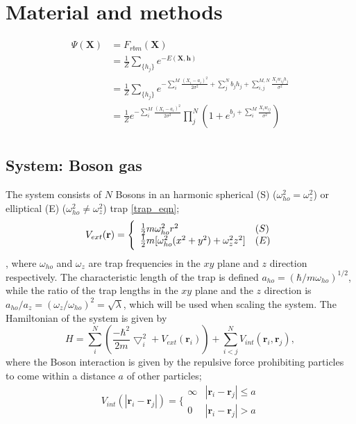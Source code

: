 \documentclass[%
oneside,                 %
final,                   %
10pt]{article}
\begin{document}
\section{Material and methods} \label{theory}

\begin{align*}
\Psi (\mathbf{X}) &= F_{rbm}(\mathbf{X}) \\
&= \frac{1}{Z}\sum_{\{h_j\}} e^{-E(\mathbf{X}, \mathbf{h})} \\
&= \frac{1}{Z} \sum_{\{h_j\}} e^{-\sum_i^M \frac{(X_i - a_i)^2}{2\sigma^2} + \sum_j^N b_j h_j + \sum_{i,j}^{M,N} \frac{X_i w_{ij} h_j}{\sigma^2}} \\
&= \frac{1}{Z} e^{-\sum_i^M \frac{(X_i - a_i)^2}{2\sigma^2}} \prod_j^N (1 + e^{b_j + \sum_i^M \frac{X_i w_{ij}}{\sigma^2}}) \\
\end{align*}

\subsection{System: Boson gas}
The system consists of $N$ Bosons in an harmonic spherical (S) ($\omega_{ho}^2=\omega_z^2$) or elliptical (E) ($\omega_{ho}^2 \neq \omega_z^2$) trap \eqref{trap_eqn};
\begin{equation}
 V_{ext}(\mathbf{r}) = 
 \Bigg\{
 \begin{array}{ll}
	 \frac{1}{2}m\omega_{ho}^2r^2 & (S)\\
 \strut
	 \frac{1}{2}m[\omega_{ho}^2(x^2+y^2) + \omega_z^2z^2] & (E)
 \label{trap_eqn}
 \end{array}
 \end{equation}, 
 where $\omega_{ho}$ and  $\omega_z$ are trap frequencies in the $xy$ plane and $z$ direction respectively. The characteristic length of the trap is defined $a_{ho}=(\hbar /m \omega_{ho})^{1/2}$, while the ratio of the trap lengths in the $xy$ plane and the $z$ direction is $a_{ho}/a_z=(\omega_z/\omega_{ho})^2=\sqrt{\lambda}$, which will be used when scaling the system. The Hamiltonian of the system is given by
\begin{equation}
     H = \sum_i^N \left(\frac{-\hbar^2}{2m}{\bigtriangledown }_{i}^2 +V_{ext}({\mathbf{r}}_i)\right)  +
	 \sum_{i<j}^{N} V_{int}({\mathbf{r}}_i,{\mathbf{r}}_j),
	 \label{eq:hamiltonian}
 \end{equation}
where the Boson interaction is given by the repulsive force prohibiting particles to come within a distance $a$ of other particles;
\begin{equation}
 V_{int}(|\mathbf{r}_i-\mathbf{r}_j|) =  \Bigg\{
 \begin{array}{ll}
	 \infty & {|\mathbf{r}_i-\mathbf{r}_j|} \leq {a}\\
	 0 & {|\mathbf{r}_i-\mathbf{r}_j|} > {a}
 \end{array}
 \end{equation}
\end{document}
